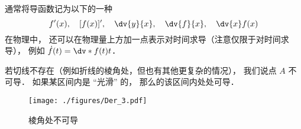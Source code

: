 
通常将导函数记为以下的一种%
\begin{equation}\label{Der_eq1}
f'(x),\quad [f(x)]',\quad \dv{y}{x},\quad \dv{f}{x},\quad \dv{x}f(x)
\end{equation}
在物理中， 还可以在物理量上方加一点表示对时间求导（注意仅限于对时间求导）， 例如 $\dot f(t) = \dv*{f(t)}{t}$．

若切线不存在（例如折线的棱角处，但也有其他更复杂的情况）， 我们说点 $A$ 不可导． 如果某区间内是 “光滑” 的， 那么的该区间内处处可导．

\begin{figure}[ht]
\centering
\texttt{[image: ./figures/Der\_3.pdf]}
\caption{棱角处不可导}
\end{figure}












